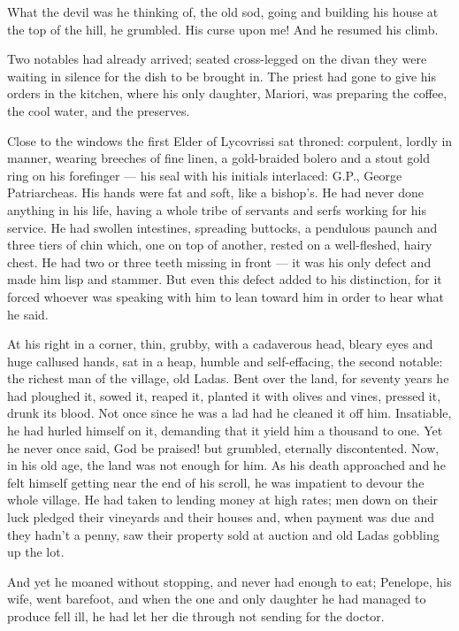 \documentclass[diploma]{softlab-thesis}
\begin{document}
What the devil was he thinking of, the old sod, going and building his house
at the top of the hill, he grumbled. His curse upon me! And he resumed his
climb.

Two notables had already arrived; seated cross-legged on the divan they were
waiting in silence for the dish to be brought in. The priest had gone to
give his orders in the kitchen, where his only daughter, Mariori, was
preparing the coffee, the cool water, and the preserves.

Close to the windows the first Elder of Lycovrissi sat throned: corpulent,
lordly in manner, wearing breeches of fine linen, a gold-braided bolero and
a stout gold ring on his forefinger --- his seal with his initials
interlaced: G.P., George Patriarcheas. His hands were fat and soft, like a
bishop’s. He had never done anything in his life, having a whole tribe of
servants and serfs working for his service. He had swollen intestines,
spreading buttocks, a pendulous paunch and three tiers of chin which, one on
top of another, rested on a well-fleshed, hairy chest. He had two or three
teeth missing in front --- it was his only defect and made him lisp and
stammer. But even this defect added to his distinction, for it forced
whoever was speaking with him to lean toward him in order to hear what he
said.

At his right in a corner, thin, grubby, with a cadaverous head, bleary eyes
and huge callused hands, sat in a heap, humble and self-effacing, the second
notable: the richest man of the village, old Ladas. Bent over the land, for
seventy years he had ploughed it, sowed it, reaped it, planted it with
olives and vines, pressed it, drunk its blood. Not once since he was a lad
had he cleaned it off him. Insatiable, he had hurled himself on it,
demanding that it yield him a thousand to one. Yet he never once said, God
be praised! but grumbled, eternally discontented. Now, in his old age, the
land was not enough for him. As his death approached and he felt himself
getting near the end of his scroll, he was impatient to devour the whole
village. He had taken to lending money at high rates; men down on their luck
pledged their vineyards and their houses and, when payment was due and they
hadn’t a penny, saw their property sold at auction and old Ladas gobbling up
the lot.

And yet he moaned without stopping, and never had enough to eat; Penelope,
his wife, went barefoot, and when the one and only daughter he had managed
to produce fell ill, he had let her die through not sending for the doctor.
\end{document}
